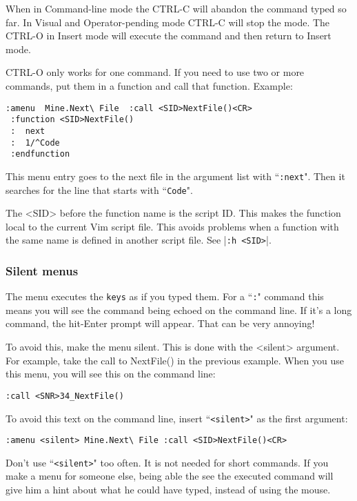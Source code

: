 When in Command-line mode the CTRL-C will abandon the command typed so far.
In Visual and Operator-pending mode CTRL-C will stop the mode.
The CTRL-O in Insert mode will execute the command and then return to Insert mode.

CTRL-O only works for one command.
If you need to use two or more commands, put them in a function and call that function.
Example:

\begin{Verbatim}[samepage=true]
 :amenu  Mine.Next\ File  :call <SID>NextFile()<CR>
 :function <SID>NextFile()
 :  next
 :  1/^Code
 :endfunction
\end{Verbatim}

This menu entry goes to the next file in the argument list with ``\texttt{:next}".
Then it searches for the line that starts with ``\texttt{Code}".

The <SID> before the function name is the script ID.
This makes the function local to the current Vim script file.
This avoids problems when a function with the same name is defined in another script file.
See |\texttt{:h <SID>}|.

\subsubsection{Silent menus}
The menu executes the \texttt{{keys}} as if you typed them.
For a ``\texttt{:}" command this means you will see the command being echoed on the command line.
If it's a long command, the hit-Enter prompt will appear.
That can be very annoying!

To avoid this, make the menu silent.
This is done with the <silent> argument.
For example, take the call to NextFile() in the previous example.
When you use this menu, you will see this on the command line:

\begin{Verbatim}[samepage=true]
    :call <SNR>34_NextFile()
\end{Verbatim}

To avoid this text on the command line, insert ``\texttt{<silent>}" as the first argument:

\begin{Verbatim}[samepage=true]
 :amenu <silent> Mine.Next\ File :call <SID>NextFile()<CR>
\end{Verbatim}

Don't use ``\texttt{<silent>}" too often.
It is not needed for short commands.
If you make a menu for someone else, being able the see the executed command will give him a hint about what he could have typed, instead of using the mouse.

